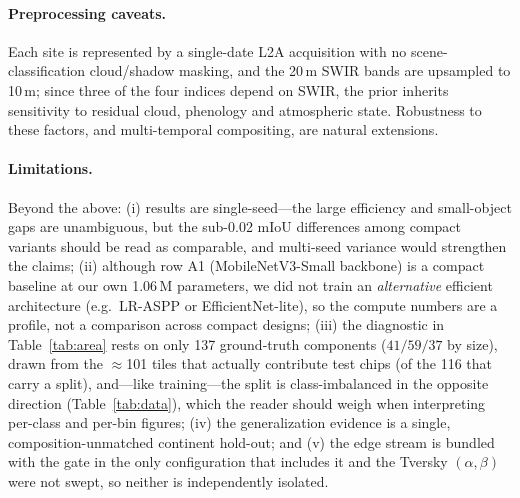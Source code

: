 \documentclass[review]{elsarticle}
\begin{document}
\paragraph{Preprocessing caveats.}
Each site is represented by a single-date L2A acquisition with no scene-classification
cloud/shadow masking, and the \num{20}\,m SWIR bands are upsampled to \num{10}\,m; since
three of the four indices depend on SWIR, the prior inherits sensitivity to residual cloud,
phenology and atmospheric state. Robustness to these factors, and multi-temporal
compositing, are natural extensions.

\paragraph{Limitations.}
Beyond the above: (i) results are single-seed---the large efficiency and small-object gaps
are unambiguous, but the sub-\num{0.02} mIoU differences among compact variants should be
read as comparable, and multi-seed variance would strengthen the claims; (ii) although row A1
(MobileNetV3-Small backbone) is a compact baseline at our own \num{1.06}\,M parameters, we did
not train an \emph{alternative} efficient architecture (e.g.\ LR-ASPP or EfficientNet-lite),
so the compute numbers are a profile, not a comparison across compact designs; (iii) the
diagnostic in Table~\ref{tab:area} rests on only \num{137} ground-truth components
($\num{41}/\num{59}/\num{37}$ by size), drawn from the $\approx$\num{101} tiles that actually
contribute test chips (of the \num{116} that carry a split), and---like training---the split
is class-imbalanced in the opposite direction (Table~\ref{tab:data}), which the reader should
weigh when interpreting per-class and per-bin figures;
(iv) the generalization evidence is a single, composition-unmatched continent hold-out; and
(v) the edge stream is bundled with the gate in the only configuration that includes it and
the Tversky $(\alpha,\beta)$ were not swept, so neither is independently isolated.

\end{document}
